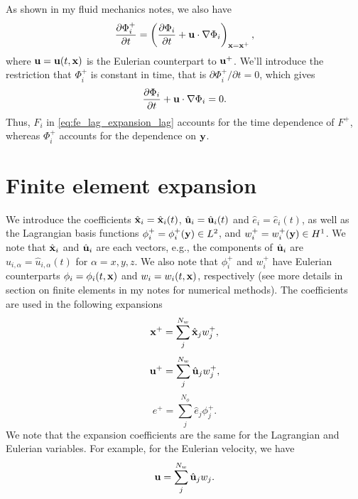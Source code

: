\documentclass[11pt]{article}
\begin{document}
As shown in my fluid mechanics notes, we also have
\begin{equation}
    \label{eq:lag_fe_deriv_correspondence}
    \frac{\partial \Phi_i^+}{\partial t} = \left ( \frac{\partial \Phi_i}{\partial t} + \mathbf{u} \cdot \nabla \Phi_i \right )_{\mathbf{x} = \mathbf{x}^+},
\end{equation}
where $\mathbf{u} = \mathbf{u}(t,\mathbf{x})$ is the Eulerian counterpart to $\mathbf{u}^+$. We'll introduce the restriction that $\Phi_i^+$ is constant in time, that is $\partial \Phi_i^+/\partial t = 0$, which gives
\begin{equation}
    \frac{\partial \Phi_i}{\partial t} + \mathbf{u} \cdot \nabla \Phi_i = 0.
\end{equation}
Thus, $F_i$ in \cref{eq:fe_lag_expansion_lag} accounts for the time dependence of $F^+$, whereas $\Phi_i^+$ accounts for the dependence on $\mathbf{y}$.

\section{Finite element expansion}
We introduce the coefficients $\hat{\mathbf{x}}_i = \hat{\mathbf{x}}_i(t)$, $\hat{\mathbf{u}}_i = \hat{\mathbf{u}}_i(t)$ and $\hat{e}_i = \hat{e}_i(t)$, as well as the Lagrangian basis functions $\phi^+_i = \phi^+_i(\mathbf{y}) \in L^2$, and $w^+_i = w^+_i(\mathbf{y}) \in H^1$. We note that $\hat{\mathbf{x}}_i$ and $\hat{\mathbf{u}}_i$ are each vectors, e.g., the components of $\hat{\mathbf{u}}_i$ are $\hat{u}_{i,\alpha} = \hat{u}_{i,\alpha}(t)$ for $\alpha = x,y,z$. We also note that $\phi^+_i$ and $w^+_i$ have Eulerian counterparts $\phi_i = \phi_i(t,\mathbf{x})$ and $w_i = w_i(t,\mathbf{x})$, respectively (see more details in section on finite elements in my notes for numerical methods). The coefficients are used in the following expansions
\begin{equation}
    \label{eq:fe_exp_x}
    \mathbf{x}^+ = \sum_j^{N_w} \hat{\mathbf{x}}_j w^+_j,
\end{equation}
\begin{equation}
    \label{eq:fe_exp_u}
    \mathbf{u}^+ = \sum_j^{N_w} \hat{\mathbf{u}}_j w^+_j,
\end{equation}
\begin{equation}
    \label{eq:fe_exp_e}
    e^+ = \sum_j^{N_\phi} \hat{e}_j \phi^+_j.
\end{equation}
We note that the expansion coefficients are the same for the Lagrangian and Eulerian variables. For example, for the Eulerian velocity, we have
\begin{equation}
    \mathbf{u} = \sum_j^{N_w} \hat{\mathbf{u}}_j w_j.
\end{equation}
\end{document}

